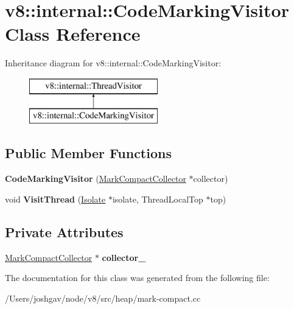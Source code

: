 \hypertarget{classv8_1_1internal_1_1_code_marking_visitor}{}\section{v8\+:\+:internal\+:\+:Code\+Marking\+Visitor Class Reference}
\label{classv8_1_1internal_1_1_code_marking_visitor}
Inheritance diagram for v8\+:\+:internal\+:\+:Code\+Marking\+Visitor\+:\begin{figure}[H]
\begin{center}
\leavevmode
\includegraphics[height=2.000000cm]{classv8_1_1internal_1_1_code_marking_visitor}
\end{center}
\end{figure}
\subsection*{Public Member Functions}
\begin{DoxyCompactItemize}
\item 
{\bfseries Code\+Marking\+Visitor} (\hyperlink{classv8_1_1internal_1_1_mark_compact_collector}{Mark\+Compact\+Collector} $\ast$collector)\hypertarget{classv8_1_1internal_1_1_code_marking_visitor_a9f59e9cca9fb762293084e19b683f880}{}\label{classv8_1_1internal_1_1_code_marking_visitor_a9f59e9cca9fb762293084e19b683f880}

\item 
void {\bfseries Visit\+Thread} (\hyperlink{classv8_1_1internal_1_1_isolate}{Isolate} $\ast$isolate, Thread\+Local\+Top $\ast$top)\hypertarget{classv8_1_1internal_1_1_code_marking_visitor_ad7ce896e6a147783b087525a59b09181}{}\label{classv8_1_1internal_1_1_code_marking_visitor_ad7ce896e6a147783b087525a59b09181}

\end{DoxyCompactItemize}
\subsection*{Private Attributes}
\begin{DoxyCompactItemize}
\item 
\hyperlink{classv8_1_1internal_1_1_mark_compact_collector}{Mark\+Compact\+Collector} $\ast$ {\bfseries collector\+\_\+}\hypertarget{classv8_1_1internal_1_1_code_marking_visitor_ae80d3624b8a4bec775e5f86cbc760ec0}{}\label{classv8_1_1internal_1_1_code_marking_visitor_ae80d3624b8a4bec775e5f86cbc760ec0}

\end{DoxyCompactItemize}


The documentation for this class was generated from the following file\+:\begin{DoxyCompactItemize}
\item 
/\+Users/joshgav/node/v8/src/heap/mark-\/compact.\+cc\end{DoxyCompactItemize}
